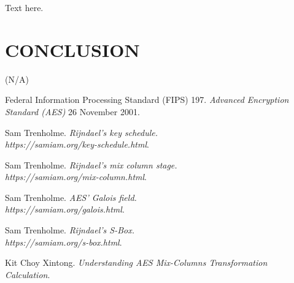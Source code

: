 \documentclass[a4paper, 10pt]{article}
\begin{document}
\begin{multicols}{2}
        Text here.

        \section{CONCLUSION}

        (N/A)

        \begin{thebibliography}{3}
            Federal Information Processing Standard (FIPS) 197.
            \textit{Advanced Encryption Standard (AES)}
            26 November 2001.

            Sam Trenholme.
            \textit{Rijndael's key schedule.\\https://samiam.org/key-schedule.html}.

            Sam Trenholme.
            \textit{Rijndael's mix column stage.\\https://samiam.org/mix-column.html}.

            Sam Trenholme.
            \textit{AES' Galois field.\\https://samiam.org/galois.html}.

            Sam Trenholme.
            \textit{Rijndael's S-Box.\\https://samiam.org/s-box.html}.

            Kit Choy Xintong.
            \textit{Understanding AES Mix-Columns Transformation Calculation}.
        \end{thebibliography}

    \end{multicols}
\end{document}
